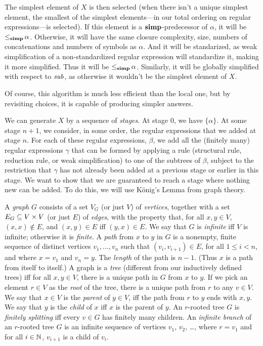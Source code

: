 The simplest element of $X$ is then selected (when there isn't a
unique simplest element, the smallest of the simplest elements---in
our total ordering on regular expressions---is selected).  If this
element is a $\mathrel{\mathbf{simp}}$-predecessor of $\alpha$, it will be
${\mathrel{\leq_{\mathbf{simp}}}}\,\alpha$. Otherwise, it will have the same closure
complexity, size, numbers of concatenations and numbers of symbols as
$\alpha$. And it will be standarized, as weak simplification of a
non-standardized regular expression will standardize it, making it
more simplified. Thus it will be ${\mathrel{\leq_{\mathbf{simp}}}}\,\alpha$.  Similarly, it
will be globally simplified with respect to ${\it sub}$, as otherwise it
wouldn't be the simplest element of $X$.

Of course, this algorithm is much less efficient than the local one,
but by revisiting choices, it is capable of producing simpler answers.

We can generate $X$ by a sequence of \emph{stages}. At stage $0$, we
have $\{\alpha\}$. At some stage $n+1$, we consider, in some order,
the regular expressions that we added at stage $n$. For each of these
regular expressions, $\beta$, we add all the (finitely many) regular
expressions $\gamma$ that can be formed by applying a rule (structural
rule, reduction rule, or weak simplification) to one of the subtrees
of $\beta$, subject to the restriction that $\gamma$ has not already
been added at a previous stage or earlier in this stage.  We want to
show that we are guaranteed to reach a stage where nothing new can be
added. To do this, we will use K\"onig's Lemma from graph theory.

A \emph{graph} $G$ consists of a set $V_G$ (or just $V$) of
\emph{vertices}, together with a set $E_G\subseteq V\times V$ (or just $E$) of
\emph{edges}, with the property that, for all $x, y\in V$,
$(x, x)\not\in E$, and $(x,y)\in E$ iff $(y, x)\in E$.  We say that
$G$ is \emph{infinite} iff $V$ is infinite; otherwise it is
\emph{finite}.  A \emph{path} from $x$ to $y$ in $G$ is a nonempty,
finite sequence of distinct vertices $v_1,\ldots,v_n$ such that
$(v_i, v_{i + 1})\in E$, for all $1\leq i < n$, and where $x = v_1$
and $v_n = y$. The \emph{length} of the path is $n-1$.  (Thus $x$ is a
path from itself to itself.) A graph is a \emph{tree} (different from
our inductively defined trees) iff for all $x,y\in V$, there is a
unique path in $G$ from $x$ to $y$. If we pick an element $r\in V$ as
the \emph{root} of the tree, there is a unique path from $r$ to any
$v\in V$. We say that $x\in V$ is the \emph{parent} of $y\in V$, iff
the path from $r$ to $y$ ends with $x, y$. We say that $y$ is the
\emph{child} of $x$ iff $x$ is the parent of $y$.  An $r$-rooted tree
$G$ is \emph{finitely splitting} iff every $v\in G$ has finitely many
children.  An \emph{infinite branch} of an $r$-rooted tree $G$ is an
infinite sequence of vertices $v_1$, $v_2$, \ldots, where $r = v_1$
and for all $i\in\mathbb{N}$, $v_{i+1}$ is a child of $v_i$.

